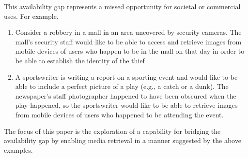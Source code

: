 
This availability gap represents a missed opportunity for societal or
commercial uses.
For example,
\begin{enumerate}
\item \label{robbery} Consider a robbery in a mall in an area
  uncovered by security cameras. The mall's security staff would like
  to be able to access and retrieve images from mobile devices of
  users who happen to be in the mall on that day in order to be able
  to establish the identity of the thief .
\item \label{sportswriter} A sportswriter is writing a report on a
  sporting event and would like to be able to include a perfect
  picture of a play (e.g., a catch or a dunk). The newspaper's staff
  photographer happened to have been obscured when the play happened,
  so the sportswriter would like to be able to retrieve images from
  mobile devices of users who happened to be attending the event.

\end{enumerate}
%
The focus of this paper is the exploration of a capability for
bridging the availability gap by enabling media retrieval in a manner
suggested by the above examples.

